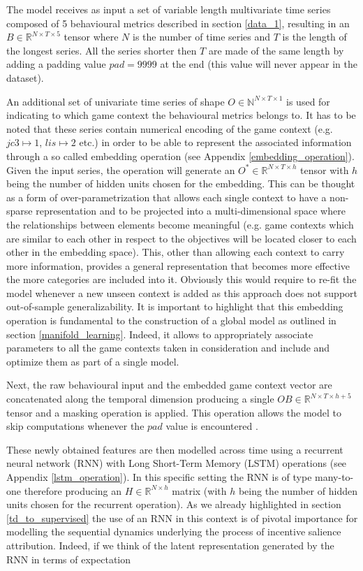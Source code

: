 The model receives as input a set of variable length multivariate time series composed of 5 behavioural metrics described in section \ref{data_1}, resulting in an $B \in \mathbb{R}^{N \times T \times 5}$ tensor where $N$ is the number of time series and $T$ is the length of the longest series. All the series shorter then $T$ are made of the same length by adding a padding value $pad=9999$ at the end (this value will never appear in the dataset). 

An additional set of univariate time series of shape $O \in \mathbb{N}^{N \times T \times 1}$ is used for indicating to which game context the behavioural metrics belongs to.  It has to be noted that these series contain numerical encoding of the game context (e.g. $jc3 \mapsto 1$, $lis \mapsto 2$ etc.) in order to be able to represent the associated information through a so called embedding operation (see Appendix \ref{embedding_operation}). Given the input series, the operation will generate an $O^* \in \mathbb{R}^{N \times T \times h}$  tensor with $h$ being the number of hidden units chosen for the embedding. This can be thought as a form of over-parametrization that allows each single context to have a non-sparse representation and to be projected into a multi-dimensional space where the relationships between elements become meaningful (e.g. game contexts which are similar to each other in respect to the objectives will be located closer to each other in the embedding space). This, other than allowing each context to carry more information, provides a general representation that becomes more effective the more categories are included into it. Obviously this would require to re-fit the model whenever a new unseen context is added as this approach does not support out-of-sample generalizability. It is important to highlight that this embedding operation is fundamental to the construction of a global model as outlined in section \ref{manifold_learning}. Indeed, it allows to appropriately associate parameters to all the game contexts taken in consideration and include and optimize them as part of a single model. 

Next, the raw behavioural input and the embedded game context vector are concatenated along the temporal dimension producing a single $OB \in \mathbb{R}^{N \times T \times h + 5}$ tensor and a masking operation is applied. This operation allows the model to skip computations whenever the $pad$ value is encountered \cite{chollet2015keras}. 

These newly obtained features are then modelled across time using a recurrent neural network (RNN) with Long Short-Term Memory (LSTM) operations (see Appendix \ref{lstm_operation}). In this specific setting the RNN is of type many-to-one \cite{bengio2017deep} therefore producing an $H \in \mathbb{R}^{N \times h}$ matrix (with $h$ being the number of hidden units chosen for the recurrent operation). As we already highlighted in section \ref{td_to_supervised} the use of an RNN in this context is of pivotal importance for modelling the sequential dynamics underlying the process of incentive salience attribution. Indeed, if we think of the latent representation generated by the RNN in terms of expectation

